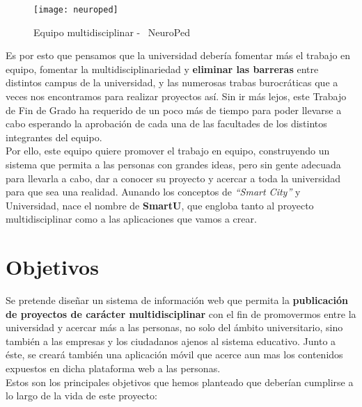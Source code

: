 \begin{figure}
    \centering
    \texttt{[image: neuroped]}
    \caption{Equipo multidisciplinar - \textcopyright\ NeuroPed \cite{neuroped}}
    \label{neuropedimagen}
\end{figure}

Es por esto que pensamos que la universidad debería fomentar más el trabajo en equipo, fomentar la multidisciplinariedad y \textbf{eliminar las barreras} entre distintos campus de la universidad, y las numerosas trabas burocráticas que a veces nos encontramos para realizar proyectos así. Sin ir más lejos, este Trabajo de Fin de Grado ha requerido de un poco más de tiempo para poder llevarse a cabo esperando la aprobación de cada una de las facultades de los distintos integrantes del equipo.\\

Por ello, este equipo quiere promover el trabajo en equipo, construyendo un sistema que permita a las personas con grandes ideas, pero sin gente adecuada para llevarla a cabo, dar a conocer su proyecto y acercar a toda la universidad para que sea una realidad. Aunando los conceptos de \textit{``Smart City''} y Universidad, nace el nombre de \textbf{SmartU}, que engloba tanto al proyecto multidisciplinar como a las aplicaciones que vamos a crear.

\section{Objetivos}
\label{sec:objetivos}

Se pretende diseñar un sistema de información web que permita la \textbf{publicación de proyectos de carácter multidisciplinar} con el fin de promovermos entre la universidad y acercar más a las personas, no solo del ámbito universitario, sino también a las empresas y los ciudadanos ajenos al sistema educativo. Junto a éste, se creará también una aplicación móvil que acerce aun mas los contenidos expuestos en dicha plataforma web a las personas.\\

Estos son los principales objetivos que hemos planteado que deberían cumplirse a lo largo de la vida de este proyecto:

